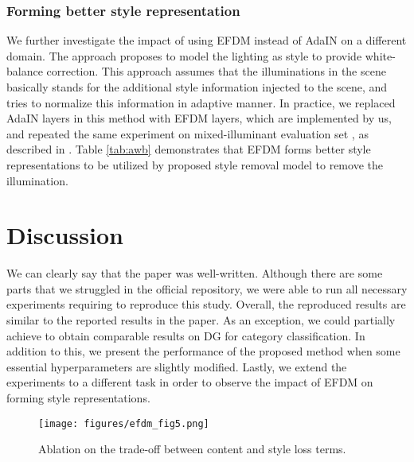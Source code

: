 \subsubsection{Forming better style representation}
We further investigate the impact of using EFDM instead of AdaIN on a different domain. The approach \cite{kinli2023modeling} proposes to model the lighting as style to provide white-balance correction. This approach assumes that the illuminations in
the scene basically stands for the additional style information injected to the scene, and tries to normalize this information in adaptive manner. In practice, we replaced AdaIN layers in this method with EFDM layers, which are implemented by us, and repeated the same experiment on mixed-illuminant evaluation set \cite{Afifi_2022_WACV}, as described in \cite{kinli2023modeling}. Table \ref{tab:awb} demonstrates that EFDM forms better style representations to be utilized by proposed style removal model to remove the illumination. 

\section{Discussion}

We can clearly say that the paper was well-written. Although there are some parts that we struggled in the official repository, we were able to run all necessary experiments requiring to reproduce this study. Overall, the reproduced results are similar to the reported results in the paper. As an exception, we could partially achieve to obtain comparable results on DG for category classification. In addition to this, we present the performance of the proposed method when some essential hyperparameters are slightly modified. Lastly, we extend the experiments to a different task in order to observe the impact of EFDM on forming style representations. 

\begin{figure}[!t]  
  \texttt{[image: figures/efdm\_fig5.png]}  
  \caption{Ablation on the trade-off between content and style loss terms.}
\label{fig:fig5}
\end{figure}

